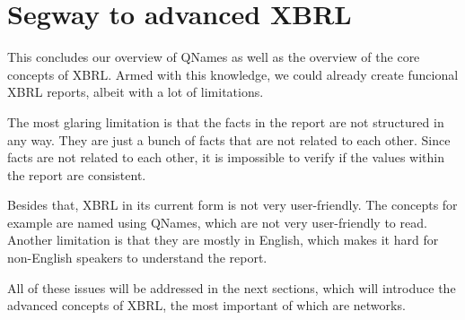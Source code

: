 \section{Segway to advanced XBRL}

This concludes our overview of QNames as well as the overview of the core concepts of XBRL.
Armed with this knowledge, we could already create funcional XBRL reports, albeit with a lot of limitations.

The most glaring limitation is that the facts in the report are not structured in any way.
They are just a bunch of facts that are not related to each other.
Since facts are not related to each other, it is impossible to verify if the values within the report are consistent.

Besides that, XBRL in its current form is not very user-friendly.
The concepts for example are named using QNames, which are not very user-friendly to read.
Another limitation is that they are mostly in English, which makes it hard for non-English speakers to understand the report.

All of these issues will be addressed in the next sections, which will introduce the advanced concepts of XBRL, 
the most important of which are networks.

